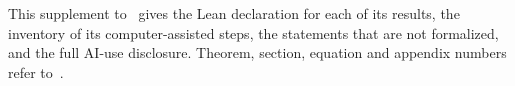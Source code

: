 \newcommand{\papertitle}{Supplement to ``Increasing ratios in finite nonnegative linearization'': formalization and AI use}
\newcommand{\papershort}{SUPPLEMENT: INCREASING RATIOS IN FINITE LINEARIZATION}
\newcommand{\paperdate}{November 1, 2026}



\maketitle

\noindent This supplement to~\cite{main} gives the Lean declaration for each of its results, the inventory of its computer-assisted steps, the statements that are not formalized, and the full AI-use disclosure. Theorem, section, equation and appendix numbers refer to~\cite{main}.

